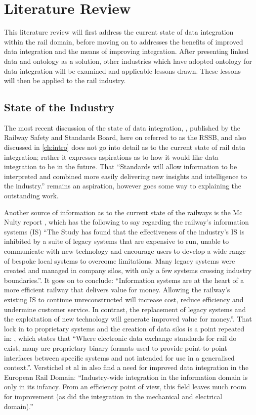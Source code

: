 \chapter{Literature Review}\label{ch:litreview}
This literature review will first address the current state of data integration within the rail domain, before moving on to addresses the benefits of improved data integration and the means of improving integration. After presenting linked data and ontology as a solution, other industries which have adopted ontology for data integration will be examined and applicable lessons drawn. These lessons will then be applied to the rail industry.

\section{State of the Industry}
\label{state}
The most recent discussion of the state of data integration, \cite{RSSB2017}, published by the Railway Safety and Standards Board, here on referred to as the RSSB, and also discussed in \autoref{ch:intro} does not go into detail as to the current state of rail data integration; rather it expresses aspirations as to how it would like data integration to be in the future. That ``Standards will allow information to be interpreted and combined more easily delivering new insights and intelligence to the industry.'' remains an aspiration, however goes some way to explaining the outstanding work.

Another source of information as to the current state of the railways is the Mc Nulty report \cite{DepartmentforTransport2011}, which has the following to say regarding the railway's information systems (IS) ``The Study has found that the effectiveness of the industry’s IS is inhibited by a suite of legacy systems that are expensive to run, unable to communicate with new technology and encourage users to develop a wide range of bespoke local systems to overcome limitations. Many legacy systems were created and managed in company silos, with only a few systems crossing industry boundaries.''. It goes on to conclude: ``Information systems are at the heart of a more efficient railway that delivers value for money. Allowing the railway’s existing IS to continue unreconstructed will increase cost, reduce efficiency and undermine customer service. In contrast, the replacement of legacy systems and the exploitation of new technology will generate improved value for money.''.  That lock in to proprietary systems and the creation of data silos is a point repeated in: \cite{Joh13}, which states that ``Where electronic data exchange standards for rail do exist, many are proprietary binary formats used to provide point-to-point interfaces between specific systems and not intended for use in a generalised context.''. Verstichel et al in \cite{Verstichel2011a} also find a need for improved data integration in the European  Rail Domain: ``Industry-wide integration in the information domain is only in its infancy. From an efficiency point of view, this field leaves much room for improvement (as did the integration in the mechanical and electrical domain).''

